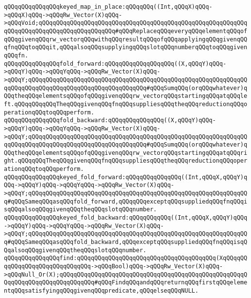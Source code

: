 \verb|qQQqqQQqqQQqqQQqkeyed_map_in_place:qQQqqQQq((Int,qQQqX)qQQq->qQQqX)qQQq->qQQqRw_Vector(X)qQQq->qQQqVoid;qQQqqQQqqQQqqQQqqQQqqQQqqQQqqQQqqQQqqQQqqQQqqQQqqQQqqQQqqQQqqQQqqQQqqQQqqQQqqQQqqQQqqQQqqQQq#qQQqReplaceqQQqeveryqQQqelementqQQqofqQQqgivenqQQqrw_vectorqQQqwithqQQqresultqQQqofqQQqapplyingqQQqgivenqQQqfnqQQqtoqQQqit,qQQqalsoqQQqsupplyingqQQqslotqQQqnumberqQQqtoqQQqgivenqQQqfn.|\newline
\newline
\verb|qQQqqQQqqQQqqQQqfold_forward:qQQqqQQqqQQqqQQqqQQq((X,qQQqY)qQQq->qQQqY)qQQq->qQQqYqQQq->qQQqRw_Vector(X)qQQq->qQQqY;qQQqqQQqqQQqqQQqqQQqqQQqqQQqqQQqqQQqqQQqqQQqqQQqqQQqqQQqqQQqqQQqqQQqqQQqqQQqqQQqqQQqqQQqqQQqqQQqqQQqqQQq#qQQqSumqQQq(orqQQqwhatever)qQQqtheqQQqelementsqQQqofqQQqgivenqQQqrw_vectorqQQqstartingqQQqatqQQqleft.qQQqqQQqqQQqTheqQQqgivenqQQqfnqQQqsuppliesqQQqtheqQQqreductionqQQqoperationqQQqtoqQQqperform.|\newline
\verb|qQQqqQQqqQQqqQQqfold_backward:qQQqqQQqqQQqqQQq((X,qQQqY)qQQq->qQQqY)qQQq->qQQqYqQQq->qQQqRw_Vector(X)qQQq->qQQqY;qQQqqQQqqQQqqQQqqQQqqQQqqQQqqQQqqQQqqQQqqQQqqQQqqQQqqQQqqQQqqQQqqQQqqQQqqQQqqQQqqQQqqQQqqQQqqQQqqQQqqQQq#qQQqSumqQQq(orqQQqwhatever)qQQqtheqQQqelementsqQQqofqQQqgivenqQQqrw_vectorqQQqstartingqQQqatqQQqright.qQQqqQQqTheqQQqgivenqQQqfnqQQqsuppliesqQQqtheqQQqreductionqQQqoperationqQQqtoqQQqperform.|\newline
\newline
\verb|qQQqqQQqqQQqqQQqkeyed_fold_forward:qQQqqQQqqQQqqQQq((Int,qQQqX,qQQqY)qQQq->qQQqY)qQQq->qQQqYqQQq->qQQqRw_Vector(X)qQQq->qQQqY;qQQqqQQqqQQqqQQqqQQqqQQqqQQqqQQqqQQqqQQqqQQqqQQqqQQqqQQqqQQqqQQq#qQQqSameqQQqasqQQqfold_forward,qQQqqQQqexceptqQQqsuppliedqQQqfnqQQqisqQQqalsoqQQqgivenqQQqtheqQQqslotqQQqnumber.|\newline
\verb|qQQqqQQqqQQqqQQqkeyed_fold_backward:qQQqqQQqqQQq((Int,qQQqX,qQQqY)qQQq->qQQqY)qQQq->qQQqYqQQq->qQQqRw_Vector(X)qQQq->qQQqY;qQQqqQQqqQQqqQQqqQQqqQQqqQQqqQQqqQQqqQQqqQQqqQQqqQQqqQQqqQQqqQQq#qQQqSameqQQqasqQQqfold_backward,qQQqexceptqQQqsuppliedqQQqfnqQQqisqQQqalsoqQQqgivenqQQqtheqQQqslotqQQqnumber.|\newline
\newline
\verb|qQQqqQQqqQQqqQQqfind:qQQqqQQqqQQqqQQqqQQqqQQqqQQqqQQqqQQqqQQq(XqQQqqQQqqQQqqQQqqQQqqQQqqQQqqQQq->qQQqBool)qQQq->qQQqRw_Vector(X)qQQq->qQQqNull_Or(X);qQQqqQQqqQQqqQQqqQQqqQQqqQQqqQQqqQQqqQQqqQQqqQQqqQQqqQQqqQQqqQQqqQQqqQQqqQQqqQQq#qQQqFindqQQqandqQQqreturnqQQqfirstqQQqelementqQQqsatisfyingqQQqgivenqQQqpredicate,qQQqelseqQQqNULL.|\newline
